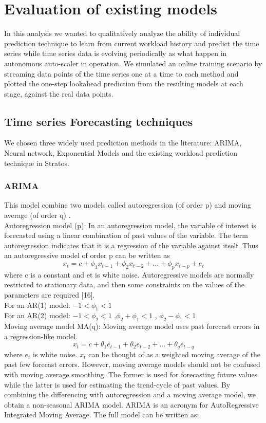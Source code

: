 \section{Evaluation of existing models}

In this analysis we wanted to qualitatively analyze the ability of individual prediction technique to learn from current workload history and predict the time series while time series data is evolving periodically as what happen in autonomous auto-scaler in operation. We simulated an online training scenario by streaming data points of the time series one at a time to each method and plotted the one-step lookahead prediction from the resulting models at each stage, against the real data points. 

\subsection{Time series Forecasting techniques}
We chosen three widely used prediction methods in the literature: ARIMA, Neural network, Exponential Models and the existing workload prediction technique in Stratos.

\subsubsection{ARIMA}
This model combine two models called autoregression (of order p) and moving average (of order q) .\\

Autoregression model (p): 
In an autoregression model, the variable of interest is forecasted using a linear combination of past values of the variable. The term autoregression indicates that it is a regression of the variable against itself. Thus an autoregressive model of order p can be written as
	$$x_t = c + \phi_1x_{ t-1} + \phi_2x_{t-2} +...+ \phi_px_{t-p} + e_{t}$$
where c is a constant and et is white noise. Autoregressive models are normally restricted to stationary data, and then some constraints on the values of the parameters are required [16]. \\
For an AR(1) model: $-1 < \phi_{1} < 1$ \\
For an AR(2) model: $-1 < \phi_{2} < 1$ ,$\phi_{2}+ \phi_{1} < 1$ , $\phi_{2} - \phi_{1} < 1$ \\
Moving average model MA(q):  
Moving average model uses past forecast errors in a regression-like model.
	$$x_t =  c + \theta_1e_{ t-1} + \theta_2e_{t-2} +...+ \theta_qe_{t-q}$$
where $e_t$ is white noise. $x_t$ can be thought of as a weighted moving average of the past few forecast errors. However, moving average models should not be confused with moving average smoothing. The former is used for forecasting future values while the latter is used for estimating the trend-cycle of past values.
By combining the differencing with autoregression and a moving average model, we obtain a non-seasonal ARIMA model. ARIMA is an acronym for AutoRegressive Integrated Moving Average. The full model can be written as:

